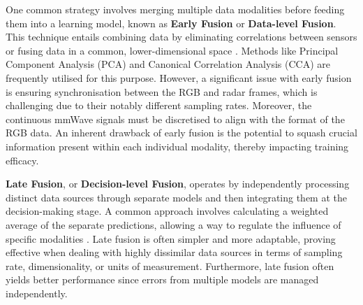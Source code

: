 \documentclass{mpaper}
\begin{document}
One common strategy involves merging multiple data modalities before feeding them into a learning model, known as \textbf{Early Fusion} or \textbf{Data-level Fusion}. This technique entails combining data by eliminating correlations between sensors or fusing data in a common, lower-dimensional space \cite{khaleghi2013multisensor}. Methods like Principal Component Analysis (PCA) and Canonical Correlation Analysis (CCA) are frequently utilised for this purpose. However, a significant issue with early fusion is ensuring synchronisation between the RGB and radar frames, which is challenging due to their notably different sampling rates. Moreover, the continuous mmWave signals must be discretised to align with the format of the RGB data. An inherent drawback of early fusion is the potential to squash crucial information present within each individual modality, thereby impacting training efficacy.

\textbf{Late Fusion}, or \textbf{Decision-level Fusion}, operates by independently processing distinct data sources through separate models and then integrating them at the decision-making stage. A common approach involves calculating a weighted average of the separate predictions, allowing a way to regulate the influence of specific modalities \cite{pawlowski2023effective}. Late fusion is often simpler and more adaptable, proving effective when dealing with highly dissimilar data sources in terms of sampling rate, dimensionality, or units of measurement. Furthermore, late fusion often yields better performance since errors from multiple models are managed independently.
\end{document}
